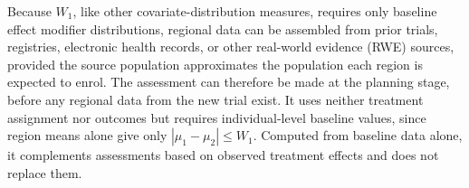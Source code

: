 \documentclass[AMA,Times1COL]{WileyNJDv5}
\begin{document}



Because $W_1$, like other covariate-distribution measures, requires only baseline effect modifier distributions, regional data can be assembled from prior trials, registries, electronic health records, or other real-world evidence (RWE) sources, provided the source population approximates the population each region is expected to enrol. The assessment can therefore be made at the planning stage, before any regional data from the new trial exist. It uses neither treatment assignment nor outcomes but requires individual-level baseline values, since region means alone give only $|\mu_1 - \mu_2| \leq W_1$. Computed from baseline data alone, it complements assessments based on observed treatment effects and does not replace them.
\end{document}

